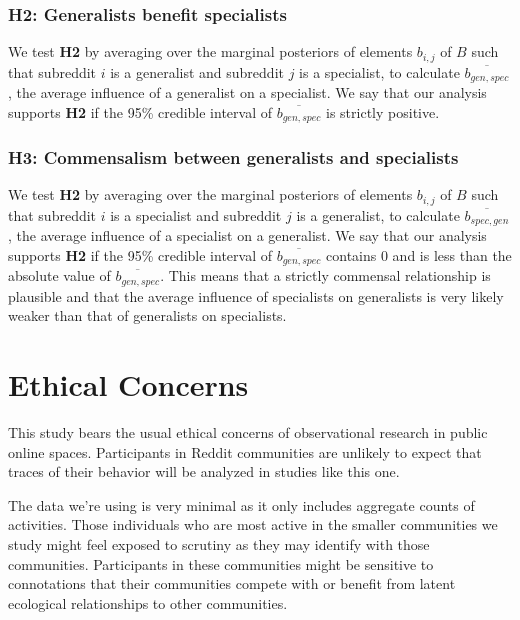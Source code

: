 \documentclass[12pt]{memoir}
\begin{document}
\subsubsection{\textbf{H2:} Generalists benefit specialists}

We test \textbf{H2} by averaging over the marginal posteriors of elements $b_{i,j}$ of $B$ such that subreddit $i$ is a generalist and subreddit $j$  is a specialist, to calculate $\overline{b_{gen,spec}}$, the average influence of a generalist on a specialist. We say that our analysis supports \textbf{H2} if the 95\% credible interval of $\overline{b_{gen,spec}}$ is strictly positive.


\subsubsection{\textbf{H3:} Commensalism between generalists and specialists}

We test \textbf{H2} by averaging over the marginal posteriors of elements $b_{i,j}$ of $B$ such that subreddit $i$ is a specialist and subreddit $j$  is a generalist, to calculate $\overline{b_{spec,gen}}$, the average influence of a specialist on a generalist. We say that our analysis supports \textbf{H2} if the 95\% credible interval of $\overline{b_{gen,spec}}$ contains 0 and is less than the absolute value of  $\overline{b_{gen,spec}}$.  This means that a strictly commensal relationship is plausible and that the average influence of specialists on generalists is very likely weaker than that of generalists on specialists.

\section{Ethical Concerns}

This study bears the usual ethical concerns of observational research in public online spaces.  Participants in Reddit communities are unlikely to expect that traces of their behavior will be analyzed in studies like this one.  

The data we're using is very minimal as it only includes aggregate counts of activities.  Those individuals who are most active in the smaller communities we study might feel exposed to scrutiny as they may identify with those communities.  Participants in these communities might be sensitive to connotations that their communities compete with or benefit from latent ecological relationships to other communities.  
\end{document}
